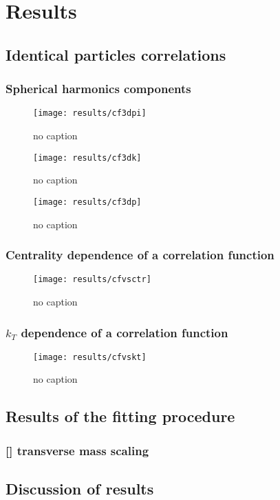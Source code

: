 \chapter{Results}
  \section{Identical particles correlations}
    \subsection{Spherical harmonics components}
      \begin{figure}[h]
        \centering
        \centerline{\texttt{[image: results/cf3dpi]}}
        \caption{no caption}
      \label{fig:cf3dpi}
      \end{figure}

      \begin{figure}[h]
        \centering
        \centerline{\texttt{[image: results/cf3dk]}}
        \caption{no caption}
      \label{fig:cf3dk}
      \end{figure} 

      \begin{figure}[h]
        \centering
        \centerline{\texttt{[image: results/cf3dp]}}
        \caption{no caption}
      \label{fig:cf3dp}
      \end{figure}  
    \FloatBarrier
    \subsection{Centrality dependence of a correlation function}
      \begin{figure}[h]
        \centering
        \centerline{\texttt{[image: results/cfvsctr]}}
        \caption{no caption}
      \label{fig:centr_dep}
      \end{figure}
    \FloatBarrier
    \subsection{$k_T$ dependence of a correlation function}
      \begin{figure}[h]
        \centering
        \centerline{\texttt{[image: results/cfvskt]}}
        \caption{no caption}
      \label{fig:kt_dep}
      \end{figure}
    \FloatBarrier
  \section{Results of the fitting procedure}
    \subsection{[] transverse mass scaling}
    \FloatBarrier
  \section{Discussion of results}

